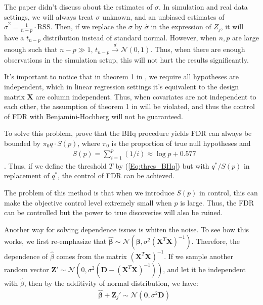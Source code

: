 \documentclass{uwstat572}
\begin{document}
The paper didn't discuss about the estimates of $\sigma$. In simulation and real data settings, we will always treat $\sigma$ unknown, and an unbiased estimates of $\hat{\sigma}^2 = \frac{1}{n-p}\cdot \text{RSS}$. Then, if we replace the $\sigma$ by $\hat{\sigma}$ in the expression of $Z_j$, it will have a $t_{n-p}$ distribution instead of standard normal. However, when $n, p$ are large enough such that $n-p\gg1$, $t_{n-p} \overset{d}{\rightarrow} \mathcal{N}(0,1)$. Thus, when there are enough observations in the simulation setup, this will not hurt the results significantly.

It's important to notice that in theorem 1 in \cite{benjamini1995controlling}, we require all hypotheses are independent, which in linear regression settings it's equivalent to the design matrix $\bm{X}$ are column independent. Thus, when covariates are not independent to each other, the assumption of theorem 1 in \cite{benjamini1995controlling} will be violated, and thus the control of FDR with Benjamini-Hochberg will not be guaranteed. 

To solve this problem, \cite{benjamini2001control} prove that the BHq procedure yields FDR can always be bounded by $\pi_0q\cdot S(p)$, where $\pi_0$ is the proportion of true null hypotheses and 
\begin{align}\label{Eq:Corrected}
& S(p) = \sum_{i=1}^p (1/i) \approx \log p + 0.577
\end{align}. Thus, if we define the threshold $T$ by (\ref{Eq:thres_BHq}) but with $q^\ast/S(p)$ in replacement of $q^\ast$, the control of FDR can be achieved. 

The problem of this method is that when we introduce $S(p)$ in control, this can make the objective control level extremely small when $p$ is large. Thus, the FDR can be controlled but the power to true discoveries will also be ruined.

Another way for solving dependence issues is whiten the noise. To see how this works, we first re-emphasize that $\hat{\bm{\beta}}\sim \mathcal{N}(\bm{\beta}, \sigma^2(\bm{X}^T\bm{X})^{-1})$. Therefore, the dependence of $\hat{\beta}$ comes from the matrix $(\bm{X}^T\bm{X})^{-1}$. If we sample another random vector $\bm{Z}' \sim \mathcal{N}(0, \sigma^2(\bm{D} - (\bm{X}^T\bm{X})^{-1}))$, and let it be independent with $\hat{\beta}$, then by the additivity of normal distribution, we have:
\begin{align}\label{Eq:whiten}
& \hat{\bm{\beta}} + \bm{Z}_j' \sim \mathcal{N}(\bm{0}, \sigma^2 \bm{D})
\end{align}
\end{document}
